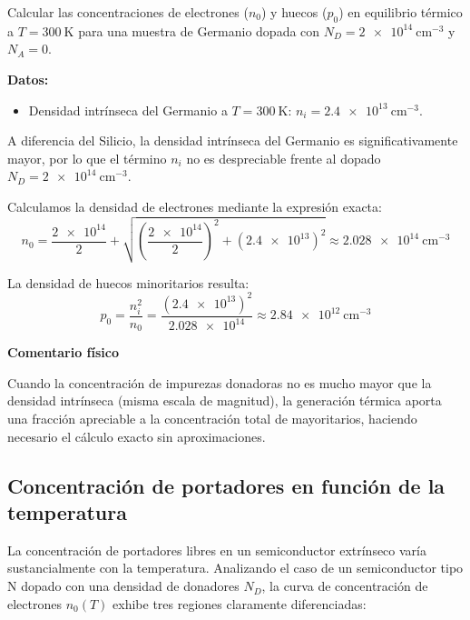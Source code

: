 \newpage

\begin{ejemplo}
Calcular las concentraciones de electrones ($n_0$) y huecos ($p_0$) en equilibrio térmico a $T = \SI{300}{\kelvin}$ para una muestra de Germanio dopada con $N_D = \SI{2e14}{\cm^{-3}}$ y $N_A = 0$.

\textbf{Datos:}
\begin{itemize}
    \item Densidad intrínseca del Germanio a $T = \SI{300}{\kelvin}$: $n_i = \SI{2.4e13}{\cm^{-3}}$.
\end{itemize}

\tcblower

A diferencia del Silicio, la densidad intrínseca del Germanio es significativamente mayor, por lo que el término $n_i$ no es despreciable frente al dopado $N_D = \SI{2e14}{\cm^{-3}}$.

Calculamos la densidad de electrones mediante la expresión exacta:
\[
n_0 = \frac{\num{2e14}}{2} + \sqrt{\left(\frac{\num{2e14}}{2}\right)^2 + (\num{2.4e13})^2} \approx \SI{2.028e14}{\cm^{-3}}
\]

La densidad de huecos minoritarios resulta:
\[
p_0 = \frac{n_i^2}{n_0} = \frac{(\num{2.4e13})^2}{\num{2.028e14}} \approx \SI{2.84e12}{\cm^{-3}}
\]

\textbf{Comentario físico}

Cuando la concentración de impurezas donadoras no es mucho mayor que la densidad intrínseca (misma escala de magnitud), la generación térmica aporta una fracción apreciable a la concentración total de mayoritarios, haciendo necesario el cálculo exacto sin aproximaciones.
\end{ejemplo}

\newpage

\subsection{Concentración de portadores en función de la temperatura}

La concentración de portadores libres en un semiconductor extrínseco varía sustancialmente con la temperatura. Analizando el caso de un semiconductor tipo N dopado con una densidad de donadores $N_D$, la curva de concentración de electrones $n_0(T)$ exhibe tres regiones claramente diferenciadas:

